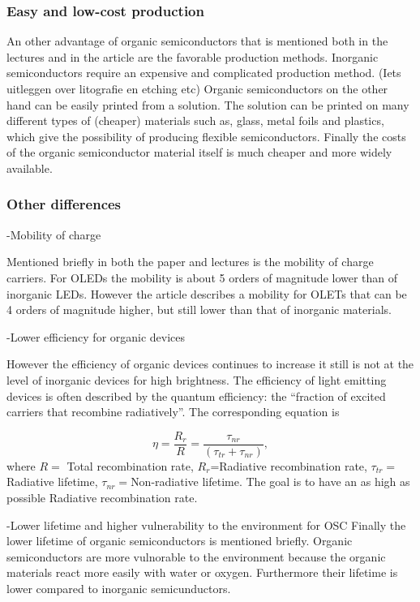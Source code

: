 \subsubsection{Easy and low-cost production}
An other advantage of organic semiconductors that is mentioned both in the lectures and in the article are the favorable production methods. Inorganic semiconductors require an expensive and complicated production method. (Iets uitleggen over litografie en etching etc) Organic semiconductors on the other hand can be easily printed from a solution. The solution can be printed on many different types of (cheaper) materials such as, glass, metal foils and plastics, which give the possibility of producing flexible semiconductors. Finally the costs of the organic semiconductor material itself is much cheaper and more widely available.
\subsubsection{Other differences}
-Mobility of charge

Mentioned briefly in both the paper and lectures is the mobility of charge carriers. For OLEDs the mobility is about 5 orders of magnitude lower than of inorganic LEDs. However the article describes a mobility for OLETs that can be 4 orders of magnitude higher, but still lower than that of inorganic materials.

-Lower efficiency for organic devices

However the efficiency of organic devices continues to increase it still is not at the level of inorganic devices for high brightness. The efficiency of light emitting devices is often described by the quantum efficiency: the ``fraction of excited carriers that recombine radiatively''. The corresponding equation is

\[
 \eta = \frac{R_{r}}{R} = \frac{\tau_{nr}}{(\tau_{tr}+\tau_{nr})},
\]
where $R=$ Total recombination rate, $R_{r}$=Radiative recombination rate, $\tau_{tr}=$Radiative lifetime, $\tau_{nr}=$Non-radiative lifetime. The goal is to have an as high as possible Radiative recombination rate. 

-Lower lifetime and higher vulnerability to the environment for OSC
Finally the lower lifetime of organic semiconductors is mentioned briefly. Organic semiconductors are more vulnorable to the environment because the organic materials react more easily with water or oxygen. Furthermore their lifetime is lower compared to inorganic semicunductors. 
